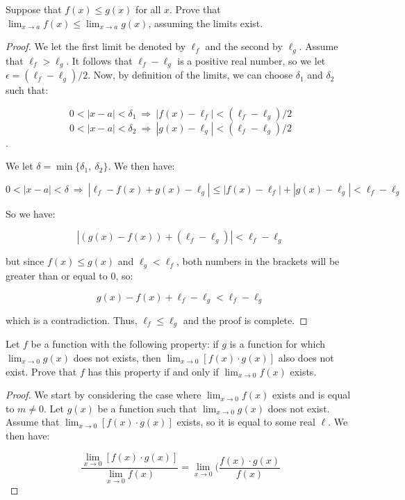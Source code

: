 \documentclass[10pt, oneside]{amsart}
\newenvironment{problem}[2][Problem]{\begin{trivlist}
\item[\hskip \labelsep {\bfseries #1}\hskip \labelsep {\bfseries #2.}]}{\end{trivlist}}
\begin{document}
    \begin{problem}{5.12}

      Suppose that $f(x) \leq g(x)$ for all $x$. Prove that $\lim_{x \to a} f(x) \leq \lim_{x \to a} g(x)$, assuming the limits exist.

    \end{problem}

    \begin{proof}

      We let the first limit be denoted by $\ell_f$ and the second by $\ell_g$. Assume that $\ell_f > \ell_g$. It follows that
      $\ell_f - \ell_g$ is a positive real number, so we let $\epsilon = (\ell_f - \ell_g)/2$. Now, by definition of the limits, we
      can choose $\delta_1$ and $\delta_2$ such that:

      $$0 < |x - a| < \delta_1 \ \Rightarrow \ |f(x) - \ell_f| < (\ell_f - \ell_g)/2$$
      $$0 < |x - a| < \delta_2 \ \Rightarrow \ |g(x) - \ell_g| < (\ell_f - \ell_g)/2$$.

      We let $\delta = \min\{\delta_1, \ \delta_2\}$. We then have:

      $$0 < |x - a| < \delta \ \Rightarrow \ |\ell_f - f(x) + g(x) - \ell_g| \leq |f(x) - \ell_f| + |g(x) - \ell_g| < \ell_f - \ell_g$$

      So we have:

      $$|(g(x) - f(x)) + (\ell_f - \ell_g)| < \ell_f - \ell_g$$

      but since $f(x) \leq g(x)$ and $\ell_g < \ell_f$, both numbers in the brackets will be greater than or equal to $0$, so:

      $$g(x) - f(x) + \ell_f - \ell_g < \ell_f - \ell_g$$

      which is a contradiction. Thus, $\ell_f \leq \ell_g$ and the proof is complete.

      \end{proof}

    \begin{problem}{5.23}

      Let $f$ be a function with the following property: if $g$ is a function for which $\lim_{x \to 0} g(x)$ does not exists, then $\lim_{x \to 0} [f(x) \cdot g(x)]$ also does not exist. Prove
      that $f$ has this property if and only if $\lim_{x \to 0} f(x)$ exists.

    \end{problem}

    \begin{proof}

      We start by considering the case where $\lim_{x \to 0} f(x)$ exists and is equal to $m \neq 0$. Let $g(x)$ be a function such that $\lim_{x \to 0} g(x)$ does not exist. Assume that $\lim_{x \to 0} [f(x) \cdot g(x)]$
      exists, so it is equal to some real $\ell$. We then have:

     $$\frac{\lim_{x \to 0} [f(x) \cdot g(x)]}{\lim_{x \to 0} f(x)} = \lim_{x \to 0} \Big(\frac{f(x) \cdot g(x)}{f(x)}$$

    \end{proof}
\end{document}
